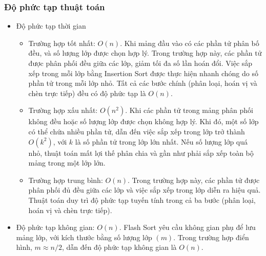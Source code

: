 \subsubsection{Độ phức tạp thuật toán}

\begin{itemize}
	\item Độ phức tạp thời gian
	\begin{itemize}[label=$\circ$]
		\item Trường hợp tốt nhất: $O(n)$. Khi mảng đầu vào có các phần tử 
		phân bố đều, và số lượng lớp được chọn hợp lý. Trong trường hợp 
		này, các phần tử được phân phối đều giữa các lớp, giảm tối đa số 
		lần hoán đổi. Việc sắp xếp trong mỗi lớp bằng Insertion Sort được 
		thực hiện nhanh chóng do số phần tử trong mỗi lớp nhỏ. Tất cả các 
		bước chính (phân loại, hoán vị và chèn trực tiếp) đều có độ phức 
		tạp là $O(n)$.
		\item Trường hợp xấu nhất: $O(n^2)$. Khi các phần tử trong mảng phân 
		phối không đều hoặc số lượng lớp được chọn không hợp lý. Khi đó, một 
		số lớp có thể chứa nhiều phần tử, dẫn đến việc sắp xếp trong lớp trở 
		thành $O(k^2)$, với $k$ là số phần tử trong lớp lớn nhất. Nếu số lượng 
		lớp quá nhỏ, thuật toán mất lợi thế phân chia và gần như phải sắp xếp 
		toàn bộ mảng trong một lớp lớn.
		\item Trường hợp trung bình: $O(n)$. Trong trường hợp này, các phần 
		tử được phân phối đủ đều giữa các lớp và việc sắp xếp trong lớp 
		diễn ra hiệu quả. Thuật toán duy trì độ phức tạp tuyến tính trong 
		cả ba bước (phân loại, hoán vị và chèn trực tiếp).
	\end{itemize}
	
	\item Độ phức tạp không gian: $O(n)$. Flash Sort yêu cầu không gian 
	phụ để lưu mảng lớp, với kích thước bằng số lượng lớp $(m)$. Trong 
	trường hợp điển hình, $m \approx n/2$, dẫn đến độ phức tạp không gian 
	là $O(n)$.
\end{itemize}